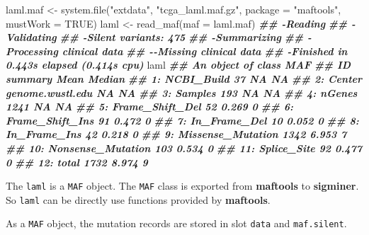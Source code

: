\documentclass[
  12pt,
  a4paper,
  twoside]{book}
\newenvironment{Shaded}{\begin{snugshade}}{\end{snugshade}}
\newcommand{\AttributeTok}[1]{\textcolor[rgb]{0.77,0.63,0.00}{#1}}
\newcommand{\ConstantTok}[1]{\textcolor[rgb]{0.00,0.00,0.00}{#1}}
\newcommand{\DocumentationTok}[1]{\textcolor[rgb]{0.56,0.35,0.01}{\textbf{\textit{#1}}}}
\newcommand{\FunctionTok}[1]{\textcolor[rgb]{0.00,0.00,0.00}{#1}}
\newcommand{\NormalTok}[1]{#1}
\newcommand{\OtherTok}[1]{\textcolor[rgb]{0.56,0.35,0.01}{#1}}
\newcommand{\StringTok}[1]{\textcolor[rgb]{0.31,0.60,0.02}{#1}}
\begin{document}
\begin{Shaded}
\begin{Highlighting}[]
\NormalTok{laml.maf }\OtherTok{\textless{}{-}} \FunctionTok{system.file}\NormalTok{(}\StringTok{"extdata"}\NormalTok{, }\StringTok{"tcga\_laml.maf.gz"}\NormalTok{, }\AttributeTok{package =} \StringTok{"maftools"}\NormalTok{, }\AttributeTok{mustWork =} \ConstantTok{TRUE}\NormalTok{)}
\NormalTok{laml }\OtherTok{\textless{}{-}} \FunctionTok{read\_maf}\NormalTok{(}\AttributeTok{maf =}\NormalTok{ laml.maf)}
\DocumentationTok{\#\# {-}Reading}
\DocumentationTok{\#\# {-}Validating}
\DocumentationTok{\#\# {-}Silent variants: 475 }
\DocumentationTok{\#\# {-}Summarizing}
\DocumentationTok{\#\# {-}Processing clinical data}
\DocumentationTok{\#\# {-}{-}Missing clinical data}
\DocumentationTok{\#\# {-}Finished in 0.443s elapsed (0.414s cpu)}
\NormalTok{laml}
\DocumentationTok{\#\# An object of class  MAF }
\DocumentationTok{\#\#                    ID          summary  Mean Median}
\DocumentationTok{\#\#  1:        NCBI\_Build               37    NA     NA}
\DocumentationTok{\#\#  2:            Center genome.wustl.edu    NA     NA}
\DocumentationTok{\#\#  3:           Samples              193    NA     NA}
\DocumentationTok{\#\#  4:            nGenes             1241    NA     NA}
\DocumentationTok{\#\#  5:   Frame\_Shift\_Del               52 0.269      0}
\DocumentationTok{\#\#  6:   Frame\_Shift\_Ins               91 0.472      0}
\DocumentationTok{\#\#  7:      In\_Frame\_Del               10 0.052      0}
\DocumentationTok{\#\#  8:      In\_Frame\_Ins               42 0.218      0}
\DocumentationTok{\#\#  9: Missense\_Mutation             1342 6.953      7}
\DocumentationTok{\#\# 10: Nonsense\_Mutation              103 0.534      0}
\DocumentationTok{\#\# 11:       Splice\_Site               92 0.477      0}
\DocumentationTok{\#\# 12:             total             1732 8.974      9}
\end{Highlighting}
\end{Shaded}

The \texttt{laml} is a \texttt{MAF} object. The \texttt{MAF} class is exported from \textbf{maftools} to \textbf{sigminer}. So \texttt{laml} can be directly use functions provided by \textbf{maftools}.

As a \texttt{MAF} object, the mutation records are stored in slot \texttt{data} and \texttt{maf.silent}.
\end{document}
